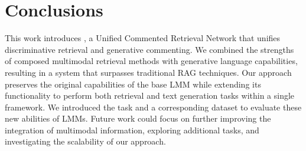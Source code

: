 \section{Conclusions}
\label{sec:conclusion}

%
%
%

This work introduces \modelname, a Unified Commented Retrieval Network that unifies discriminative retrieval and generative commenting. 
We combined the strengths of composed multimodal retrieval methods with generative language capabilities, resulting in a system that surpasses traditional RAG techniques.
%
Our approach preserves the original capabilities of the base LMM while extending its functionality to perform both retrieval and text generation tasks within a single framework.
We introduced the \tasknameshort task and a corresponding dataset to evaluate these new abilities of LMMs.
%
%
Future work could focus on further improving the integration of multimodal information, exploring additional tasks, and investigating the scalability of our approach. %
